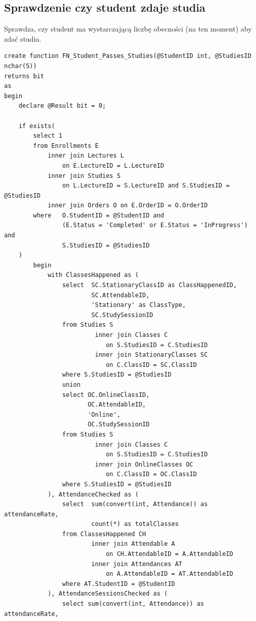\documentclass[11pt,a4paper]{article}
\begin{document}
\subsection{Sprawdzenie czy student zdaje studia}
Sprawdza, czy student ma wystarczającą liczbę obecności (na ten moment) aby zdać studia.
\begin{Verbatim}[breaklines=true]
create function FN_Student_Passes_Studies(@StudentID int, @StudiesID nchar(5))
returns bit
as
begin
    declare @Result bit = 0;

    if exists(
        select 1
        from Enrollments E
            inner join Lectures L 
                on E.LectureID = L.LectureID
            inner join Studies S 
                on L.LectureID = S.LectureID and S.StudiesID = @StudiesID
            inner join Orders O on E.OrderID = O.OrderID
        where   O.StudentID = @StudentID and 
                (E.Status = 'Completed' or E.Status = 'InProgress') and 
                S.StudiesID = @StudiesID
    )
        begin
            with ClassesHappened as (
                select  SC.StationaryClassID as ClassHappenedID, 
                        SC.AttendableID, 
                        'Stationary' as ClassType, 
                        SC.StudySessionID
                from Studies S
                         inner join Classes C 
                            on S.StudiesID = C.StudiesID
                         inner join StationaryClasses SC 
                            on C.ClassID = SC.ClassID
                where S.StudiesID = @StudiesID
                union
                select OC.OnlineClassID, 
                       OC.AttendableID, 
                       'Online',
                       OC.StudySessionID
                from Studies S
                         inner join Classes C 
                            on S.StudiesID = C.StudiesID
                         inner join OnlineClasses OC 
                            on C.ClassID = OC.ClassID
                where S.StudiesID = @StudiesID
            ), AttendanceChecked as (
                select  sum(convert(int, Attendance)) as attendanceRate, 
                        count(*) as totalClasses
                from ClassesHappened CH
                        inner join Attendable A 
                            on CH.AttendableID = A.AttendableID
                        inner join Attendances AT 
                            on A.AttendableID = AT.AttendableID
                where AT.StudentID = @StudentID
            ), AttendanceSessionsChecked as (
                select sum(convert(int, Attendance)) as attendanceRate, 

\end{Verbatim}
\end{document}
